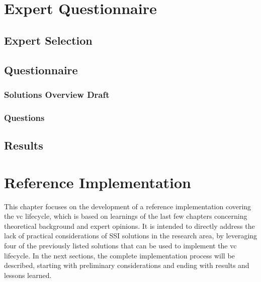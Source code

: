 
\chapter{Expert Questionnaire}\label{chapter: expert}

	\section{Expert Selection}
	
	\section{Questionnaire}
	\subsection{Solutions Overview Draft}
	\subsection{Questions}

	\section{Results}
	
	
\chapter{Reference Implementation}\label{chapter: implementation}

This chapter focuses on the development of a reference implementation covering the \ac{vc} lifecycle, which is based on learnings of the last few chapters concerning theoretical background and expert opinions. It is intended to directly address the lack of practical considerations of \ac{SSI} solutions in the research area, by leveraging four of the previously listed solutions that can be used to implement the \ac{vc} lifecycle. In the next sections, the complete implementation process will be described, starting with preliminary considerations and ending with results and lessons learned.

